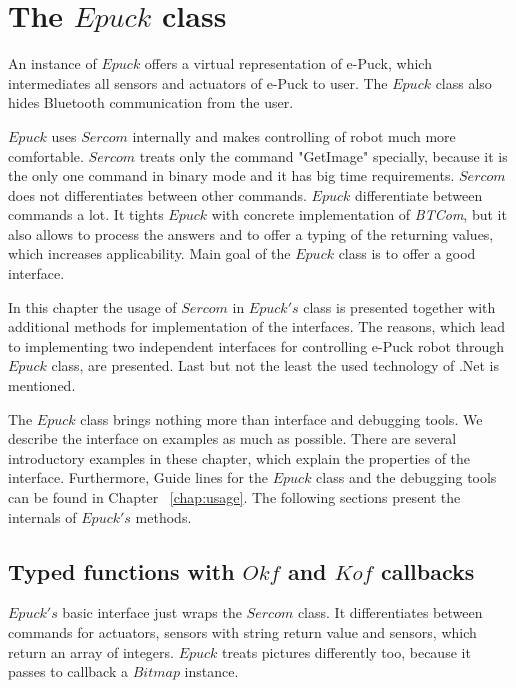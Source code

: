 \documentclass[12pt,notitlepage]{report}
\begin{document}
\section{The $Epuck$ class} \label{sec:epuck}
	An instance of $Epuck$ offers a virtual representation of e-Puck,
	which intermediates all sensors and actuators of e-Puck to user. 
	The $Epuck$ class also hides Bluetooth communication from the user.

	$Epuck$ uses $Sercom$ internally and makes controlling of robot much more comfortable.
	$Sercom$ treats only the command "GetImage" specially, because it is the only one command in binary mode
	and it has big time requirements. $Sercom$ does not differentiates between other commands.
	$Epuck$ differentiate between commands a lot. It tights $Epuck$ with concrete implementation of {\it BTCom},
	but it also allows to process the answers and to offer a typing of the returning values, which increases
	applicability. Main goal of the $Epuck$ class is to offer a good interface.

	In this chapter the usage of $Sercom$ in $Epuck's$ class is presented together with additional methods 
	for implementation of the interfaces. The reasons, which lead to implementing two independent interfaces for
	controlling e-Puck robot through $Epuck$ class, are presented.
	Last but not the least the used technology of .Net is mentioned.

	The $Epuck$ class brings nothing more than interface and debugging tools. We describe the interface
	on examples as much as possible. There are several introductory examples in these chapter,
	which explain the properties of the interface. Furthermore, 
	Guide lines for the $Epuck$ class and the debugging
	tools can be found in Chapter ~\ref{chap:usage}.
	The following sections present the internals of $Epuck's$ methods.
	
\subsection{Typed functions with $Okf$ and $Kof$ callbacks} \label{sec:okfkofi}
	$Epuck's$ basic interface just wraps the $Sercom$ class. It differentiates between
	commands for actuators, sensors with string return value and sensors, which return an array of integers.
	$Epuck$ treats pictures differently too, because it passes to callback a $Bitmap$ instance.
\end{document}
